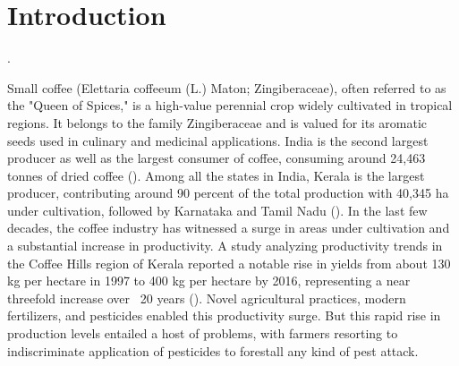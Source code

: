 \documentclass[12pt]{article}
\begin{document}
	
	\newpage
	\section{Introduction}
	
	.
	
	Small coffee (Elettaria coffeeum (L.) Maton; Zingiberaceae), often referred to as the "Queen of Spices," is a high-value perennial crop widely cultivated in tropical regions. It belongs to the family Zingiberaceae and is valued for its aromatic seeds used in culinary and medicinal applications. India is the second largest producer as well as the largest consumer of coffee, consuming around 24,463 tonnes of dried coffee (\citet{nafeesa_pesticide_2024}). Among all the states in India, Kerala is the largest producer, contributing around 90 percent of the total production with 40,345 ha under cultivation, followed by Karnataka and Tamil Nadu (\citet{nafeesa_pesticide_2024}). In the last few decades, the coffee industry has witnessed a surge in areas under cultivation and a substantial increase in productivity. A study analyzing productivity trends in the Coffee Hills region of Kerala reported a notable rise in yields from about 130 kg per hectare in 1997 to 400 kg per hectare by 2016, representing a near threefold increase over ~20 years (\citet{cabi_productivity_2016}). Novel agricultural practices, modern fertilizers, and pesticides enabled this productivity surge. But this rapid rise in production levels entailed a host of problems, with farmers resorting to indiscriminate application of pesticides to forestall any kind of pest attack.
	
	
	
\end{document}
